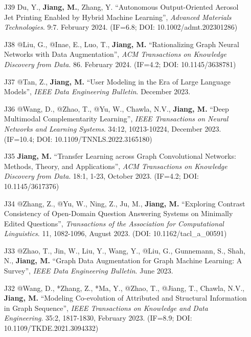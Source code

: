 \documentclass[10pt]{article}
\newenvironment{myindentpar}[1]%
{\begin{list}{}%
         {\setlength{\leftmargin}{#1}}%
         \item[]%
}
{\end{list}}
\newcounter{list}
\begin{document}
\begin{myindentpar}{0.00cm}
\begin{enumerate}[leftmargin=.5cm]
\item[J39] Du, Y., \textbf{Jiang, M.}, Zhang, Y. ``Autonomous Output-Oriented Aerosol Jet Printing Enabled by Hybrid Machine Learning'', \textit{Advanced Materials Technologies}. 9:7. February 2024. (IF=6.8; DOI: 10.1002/admt.202301286)

\item[J38] @Liu, G., @Inae, E., Luo, T., \textbf{Jiang, M.} ``Rationalizing Graph Neural Networks with Data Augmentation'', \textit{ACM Transactions on Knowledge Discovery from Data}. 86. February 2024. (IF=4.2; DOI: 10.1145/3638781)

\item[J37] @Tan, Z., \textbf{Jiang, M.} ``User Modeling in the Era of Large Language Models'', \textit{IEEE Data Engineering Bulletin}. December 2023.

\item[J36] @Wang, D., @Zhao, T., @Yu, W., Chawla, N.V., \textbf{Jiang, M.} ``Deep Multimodal Complementarity Learning'', \textit{IEEE Transactions on Neural Networks and Learning Systems}. 34:12, 10213-10224, December 2023. (IF=10.4; DOI: 10.1109/TNNLS.2022.3165180)

\item[J35] \textbf{Jiang, M.} ``Transfer Learning across Graph Convolutional Networks: Methods, Theory, and Applications'', \textit{ACM Transactions on Knowledge Discovery from Data}. 18:1, 1-23, October 2023. (IF=4.2; DOI: 10.1145/3617376)

\item[J34] @Zhang, Z., @Yu, W., Ning, Z., Ju, M., \textbf{Jiang, M.} ``Exploring Contrast Consistency of Open-Domain Question Answering Systems on Minimally Edited Questions'', \textit{Transactions of the Association for Computational Linguistics}. 11, 1082-1096, August 2023. (DOI: 10.1162/tacl\_a\_00591)
	
\item[J33] @Zhao, T., Jin, W., Liu, Y., Wang, Y., @Liu, G., Gunnemann, S., Shah, N., \textbf{Jiang, M.} ``Graph Data Augmentation for Graph Machine Learning: A Survey'', \textit{IEEE Data Engineering Bulletin}. June 2023.
	
\item[J32] @Wang, D., *Zhang, Z., *Ma, Y., @Zhao, T., @Jiang, T., Chawla, N.V., \textbf{Jiang, M.} ``Modeling Co-evolution of Attributed and Structural Information in Graph Sequence'', \textit{IEEE Transactions on Knowledge and Data Engineering}. 35:2, 1817-1830, February 2023. (IF=8.9; DOI: 10.1109/TKDE.2021.3094332)


\end{enumerate}
\end{myindentpar}
\end{document}
